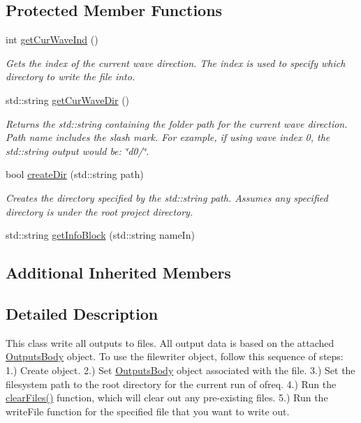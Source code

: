 \subsection*{Protected Member Functions}
\begin{DoxyCompactItemize}
\item 
int \hyperlink{classosea_1_1ofreq_1_1_file_writer_a9748d987475a225b49e14f48b8be0cd6}{get\-Cur\-Wave\-Ind} ()
\begin{DoxyCompactList}\small\item\em Gets the index of the current wave direction. The index is used to specify which directory to write the file into. \end{DoxyCompactList}\item 
std\-::string \hyperlink{classosea_1_1ofreq_1_1_file_writer_a82a3acb66bd5c0396836386258608a40}{get\-Cur\-Wave\-Dir} ()
\begin{DoxyCompactList}\small\item\em Returns the std\-::string containing the folder path for the current wave direction. Path name includes the slash mark. For example, if using wave index 0, the std\-::string output would be\-: \char`\"{}d0/\char`\"{}. \end{DoxyCompactList}\item 
bool \hyperlink{classosea_1_1ofreq_1_1_file_writer_ae8deeb9fc4323edf326fb0dadc4f9380}{create\-Dir} (std\-::string path)
\begin{DoxyCompactList}\small\item\em Creates the directory specified by the std\-::string path. Assumes any specified directory is under the root project directory. \end{DoxyCompactList}\item 
std\-::string \hyperlink{classosea_1_1ofreq_1_1_file_writer_a8b2b109105916979fe152960bbadcf7f}{get\-Info\-Block} (std\-::string name\-In)
\end{DoxyCompactItemize}
\subsection*{Additional Inherited Members}


\subsection{Detailed Description}
This class write all outputs to files. All output data is based on the attached \hyperlink{classosea_1_1ofreq_1_1_outputs_body}{Outputs\-Body} object. To use the filewriter object, follow this sequence of steps\-: 1.) Create object. 2.) Set \hyperlink{classosea_1_1ofreq_1_1_outputs_body}{Outputs\-Body} object associated with the file. 3.) Set the filesystem path to the root directory for the current run of ofreq. 4.) Run the \hyperlink{classosea_1_1ofreq_1_1_file_writer_a74a40c3c47b4d12582a2aa44c38d9d07}{clear\-Files()} function, which will clear out any pre-\/existing files. 5.) Run the write\-File function for the specified file that you want to write out.

